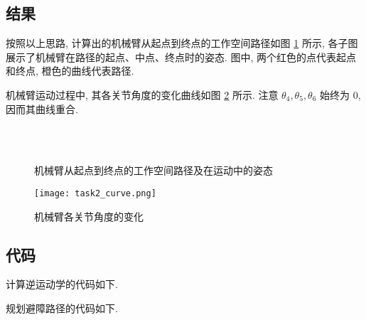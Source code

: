 \documentclass{article}
\begin{document}
\subsection{结果}
按照以上思路, 计算出的机械臂从起点到终点的工作空间路径如图 \ref{path} 所示, 各子图展示了机械臂在路径的起点、中点、终点时的姿态. 图中, 两个红色的点代表起点和终点, 橙色的曲线代表路径.\par
机械臂运动过程中, 其各关节角度的变化曲线如图 \ref{angle} 所示. 注意 $\theta_4,\theta_5,\theta_6$ 始终为 0, 因而其曲线重合.\par
\begin{figure}[H]
    \centering
    \\
    \\
    \caption{\label{path}机械臂从起点到终点的工作空间路径及在运动中的姿态}
\end{figure}
\medskip
\begin{figure}[H]
    \centering
    \texttt{[image: task2\_curve.png]}
    \caption{机械臂各关节角度的变化}
    \label{angle}
\end{figure}



\subsection{代码}
计算逆运动学的代码如下.\par
\medskip

\medskip
规划避障路径的代码如下.\par
\medskip

\end{document}
